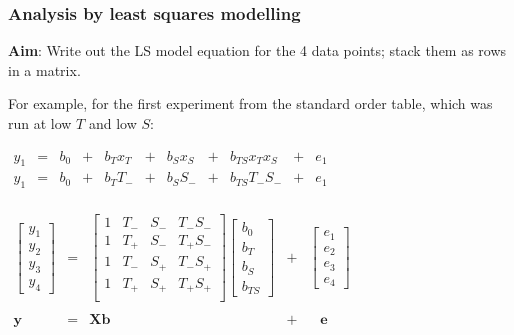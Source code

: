 \begin{frame}\frametitle{Analysis by least squares modelling}
	\textbf{Aim}: Write out the LS model equation for the 4 data points; stack them as rows in a matrix.
	
	\vspace{12pt}
	For example, for the first experiment from the standard order table, which was run at low $T$ and low $S$:
	
	\begin{center}
		$
		\begin{array}{rcccccccccc}
			y_1 &= &b_0 &+ &b_Tx_T    &+ &b_S x_S   &+ &b_{TS} x_Tx_S     &+ &e_1\\
			y_1 &= &b_0 &+ &b_T T_{-} &+ &b_S S_{-} &+ &b_{TS} T_{-}S_{-} &+ &e_1\\
		\end{array}
		$
	
		\vspace{12pt}
		$
		\begin{array}{rcccl}
			\begin{bmatrix}
				y_1\\
				y_2\\
				y_3 \\
				y_4
			\end{bmatrix}
			&=&
			\begin{bmatrix}
				1 & T_{-} & S_{-} & T_{-}S_{-}\\
				1 & T_{+} & S_{-} & T_{+}S_{-}\\
				1 & T_{-} & S_{+} & T_{-}S_{+}\\
				1 & T_{+} & S_{+} & T_{+}S_{+}\\
			\end{bmatrix}
			\begin{bmatrix}
				b_0 \\
				b_T \\
				b_S \\
				b_{TS}
			\end{bmatrix}
			&+&
			\begin{bmatrix}
				e_1\\
				e_2\\
				e_3 \\
				e_4
			\end{bmatrix}
			\\
			\\
			\mathbf{y} &=& \mathbf{X} \mathbf{b} &+& \,\,\,\,\,\mathbf{e} \\
		\end{array}
		$
	\end{center}
\end{frame}

